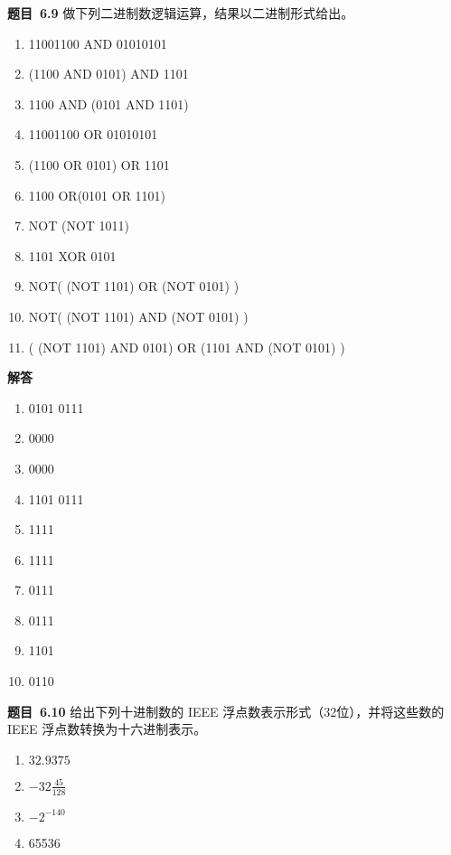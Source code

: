 \documentclass[10pt,a4paper,UTF8]{ctexart}
\newcommand{\problemname}{待定义}
\newenvironment{problem}{\begin{shaded}\par\noindent\textbf{题目\  \problemname}}{\end{shaded}\par}
\newenvironment{solution}{\par\noindent\textbf{解答}\ }{\par}
\begin{document}
\renewcommand{\problemname}{6.9}
\begin{problem}
	做下列二进制数逻辑运算，结果以二进制形式给出。
	\begin{enumerate}[(1)]
		\item 11001100 AND 01010101
		\item (1100 AND 0101) AND 1101
		\item 1100 AND (0101 AND 1101)
		\item 11001100 OR 01010101
		\item (1100 OR 0101) OR 1101
		\item 1100 OR(0101 OR 1101)
		\item NOT (NOT 1011)
		\item 1101 XOR 0101
		\item NOT( (NOT 1101) OR (NOT 0101) )
		\item NOT( (NOT 1101) AND (NOT 0101) )
		\item ( (NOT 1101) AND 0101) OR (1101 AND (NOT 0101) )
	\end{enumerate}
\end{problem}

\begin{solution}
	\begin{enumerate}[(1)]
		\item 0101 0111
		\item 0000
		\item 0000
		\item 1101 0111
		\item 1111
		\item 1111
		\item 0111
		\item 0111
		\item 1101
		\item 0110
	\end{enumerate}
	
\end{solution}


\renewcommand{\problemname}{6.10}
\begin{problem}
	给出下列十进制数的 IEEE 浮点数表示形式（32位），并将这些数的 IEEE 浮点数转换为十六进制表示。
	\begin{enumerate}[(1)]
		\item $32.9375$
		\item $-32\frac{45}{128}$
		\item $-2^{-140}$
		\item 65536
	\end{enumerate}
\end{problem}
\end{document}
